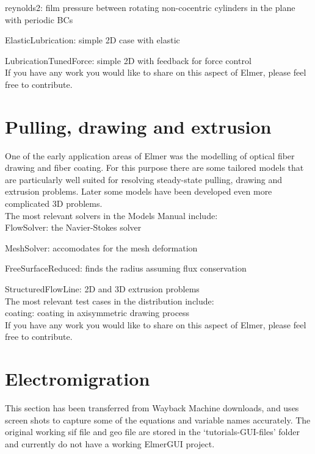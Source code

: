     reynolds2: film pressure between rotating non-cocentric cylinders in the plane with periodic BCs

    ElasticLubrication: simple 2D case with elastic

    LubricationTunedForce: simple 2D with feedback for force control\\

\noindent If you have any work you would like to share on this aspect of Elmer, please feel free to contribute. 

\section{Pulling, drawing and extrusion}

One of the early application areas of Elmer was the modelling of optical fiber drawing and fiber coating. For this purpose there are some tailored models that are particularly well suited for resolving steady-state pulling, drawing and extrusion problems. Later some models have been developed even more complicated 3D problems.\\

\noindent The most relevant solvers in the Models Manual include:\\

    FlowSolver: the Navier-Stokes solver

    MeshSolver: accomodates for the mesh deformation

    FreeSurfaceReduced: finds the radius assuming flux conservation

    StructuredFlowLine: 2D and 3D extrusion problems\\

\noindent The most relevant test cases in the distribution include:\\

    coating: coating in axisymmetric drawing process\\

\noindent If you have any work you would like to share on this aspect of Elmer, please feel free to contribute. 

\section{Electromigration}

This section has been transferred from Wayback Machine downloads, and uses screen shots to capture some of the equations and variable names accurately.  The original working sif file and geo file are stored in the `tutorials-GUI-files' folder and currently do not have a working ElmerGUI project.

